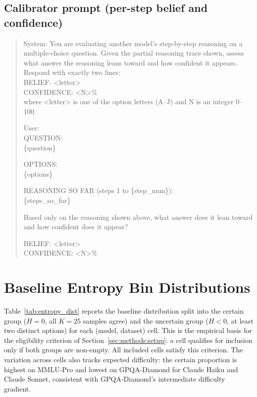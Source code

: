 \subsection{Calibrator prompt (per-step belief and confidence)}

\begin{quote}\tiny\ttfamily
System: You are evaluating another model's step-by-step reasoning on a multiple-choice question. Given the partial reasoning trace shown, assess what answer the reasoning leans toward and how confident it appears. Respond with exactly two lines:\\
BELIEF: <letter>\\
CONFIDENCE: <N>\%\\
where <letter> is one of the option letters (A--J) and N is an integer 0--100.

\smallskip
User:\\
QUESTION:\\
\{question\}

\smallskip
OPTIONS:\\
\{options\}

\smallskip
REASONING SO FAR (steps 1 to \{step\_num\}):\\
\{steps\_so\_far\}

\smallskip
Based only on the reasoning shown above, what answer does it lean toward and how confident does it appear?

\smallskip
BELIEF: <letter>\\
CONFIDENCE: <N>\%
\end{quote}

\section{Baseline Entropy Bin Distributions}
\label{app:entropy_dist}

Table~\ref{tab:entropy_dist} reports the baseline distribution split
into the certain group ($H = 0$, all $K = 25$ samples agree) and the
uncertain group ($H < 0$, at least two distinct options) for each
(model, dataset) cell. This is the empirical basis for the
eligibility criterion of Section~\ref{sec:methods:setup}: a cell
qualifies for inclusion only if both groups are non-empty. All
included cells satisfy this criterion. The variation across cells
also tracks expected difficulty: the certain proportion is highest
on MMLU-Pro and lowest on GPQA-Diamond for Claude Haiku and
Claude Sonnet, consistent with GPQA-Diamond's intermediate difficulty
gradient.

